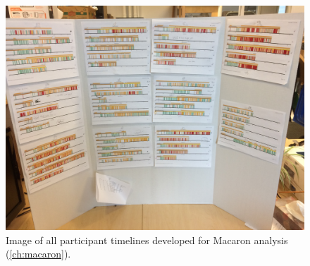 	\begin{figure}[htbp] %
	   \centering
	   \includegraphics[width=\textwidth]{Chapter99-SupportingMaterials/MethodExamples/MacaronTimelines} 
	   \caption{Image of all participant timelines developed for Macaron analysis (\autoref{ch:macaron}).}
	   \label{fig:SupportingMaterials:MethodExamples:MacaronTimelines}
	\end{figure}




\endinput